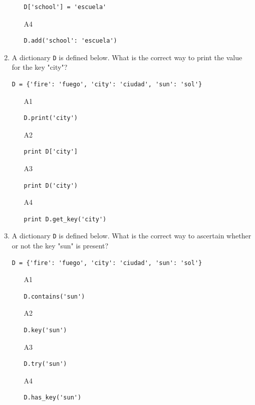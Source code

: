 \begin{enumerate}
\begin{enumerate}
\begin{verbatim}
D['school'] = 'escuela'
\end{verbatim}
\item[A4] 
\begin{verbatim}
D.add('school': 'escuela')
\end{verbatim}
\end{enumerate}
\item A dictionary {\tt D} is defined below. What is the correct way to print the value for 
the key "city"?
\begin{verbatim}
D = {'fire': 'fuego', 'city': 'ciudad', 'sun': 'sol'}
\end{verbatim}
\begin{enumerate}
\item[A1] 
\begin{verbatim}
D.print('city')
\end{verbatim}
\item[A2] 
\begin{verbatim}
print D['city']
\end{verbatim}
\item[A3] 
\begin{verbatim}
print D('city')
\end{verbatim}
\item[A4] 
\begin{verbatim}
print D.get_key('city')
\end{verbatim}
\end{enumerate}
\item A dictionary {\tt D} is defined below. What is the correct way to ascertain whether
or not the key "sun" is present?
\begin{verbatim}
D = {'fire': 'fuego', 'city': 'ciudad', 'sun': 'sol'}
\end{verbatim}
\begin{enumerate}
\item[A1] 
\begin{verbatim}
D.contains('sun')
\end{verbatim}
\item[A2] 
\begin{verbatim}
D.key('sun')
\end{verbatim}
\item[A3] 
\begin{verbatim}
D.try('sun')
\end{verbatim}
\item[A4] 
\begin{verbatim}
D.has_key('sun')
\end{verbatim}

\end{enumerate}
\end{enumerate}
